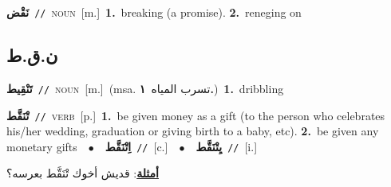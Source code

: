 \documentclass[10pt,a4paper,twoside]{article} %
\begin{document}
\begin{multicols}{2}
{\setlength\topsep{0pt}\textbf{\foreignlanguage{arabic}{نَقْض}}\ {\color{gray}\texttt{//}\color{black}}\ \textsc{noun}\ [m.]\ \textbf{1.}~breaking (a promise).  \textbf{2.}~reneging on\ } \vspace{2mm}

\vspace{-3mm}
\subsection*{\color{blue}\foreignlanguage{arabic}{ن.ق.ط}\color{blue}{}} 

{\setlength\topsep{0pt}\textbf{\foreignlanguage{arabic}{تَنْقِيط}}\ {\color{gray}\texttt{//}\color{black}}\ \textsc{noun}\ [m.]\ \color{gray}(msa. \foreignlanguage{arabic}{تسرب المياه}~\foreignlanguage{arabic}{\textbf{١.}})\color{black}\ \textbf{1.}~dribbling\ } \vspace{2mm}

{\setlength\topsep{0pt}\textbf{\foreignlanguage{arabic}{تْنَقَّط}}\ {\color{gray}\texttt{//}\color{black}}\ \textsc{verb}\ [p.]\ \textbf{1.}~be given money as a gift (to the person who celebrates his/her wedding, graduation or giving birth to a baby, etc).  \textbf{2.}~be given any monetary gifts\ \ $\bullet$\ \ \setlength\topsep{0pt}\textbf{\foreignlanguage{arabic}{اِتْنَقَّط}}\ {\color{gray}\texttt{//}\color{black}}\ [c.]\ \ $\bullet$\ \ \setlength\topsep{0pt}\textbf{\foreignlanguage{arabic}{يِتْنَقَّط}}\ {\color{gray}\texttt{//}\color{black}}\ [i.]\  \begin{flushright}\color{gray}\foreignlanguage{arabic}{\textbf{\underline{\foreignlanguage{arabic}{أمثلة}}}: قديش أخوك تْنَقَّط بعرسه؟}\end{flushright}\color{black}} \vspace{2mm}


\end{multicols}
\end{document}
